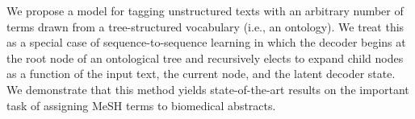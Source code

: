 We propose a model for tagging unstructured texts with an arbitrary number of terms drawn from a tree-structured vocabulary (i.e., an ontology). We treat this as a special case of sequence-to-sequence learning in which the decoder begins at the root node of an ontological tree and recursively elects to expand child nodes as a function of the input text, the current node, and the latent decoder state. We demonstrate that this method yields state-of-the-art results on the important task of assigning MeSH terms to biomedical abstracts.
